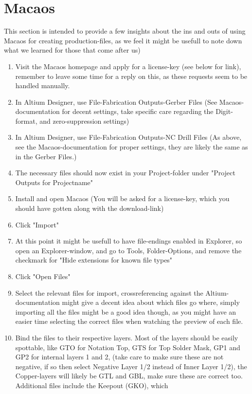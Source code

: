 \section {Macaos}

This section is intended to provide a few insights about the
ins and outs of using Macaos for creating production-files, as we feel 
it might be usefull to note down what we learned for those that come after us)

\begin {enumerate}
\item Visit the Macaos homepage and apply for a license-key (see below for link), remember to leave some
time for a reply on this, as these requests seem to be handled manually.
\item In Altium Designer, use File-Fabrication Outputs-Gerber Files (See Macaos-documentation for decent settings, take specific care regarding the Digit-format, and zero-suppression settings)
\item In Altium Designer, use File-Fabrication Outputs-NC Drill Files (As above, see the Macaos-documentation for proper settings, they are likely the same as in the Gerber Files.)
\item The necessary files should now exist in your Project-folder under "Project Outputs for Projectname"
\item Install and open Macaos (You will be asked for a license-key, which you should have gotten along with
the download-link)
\item Click "Import"
\item At this point it might be usefull to have file-endings enabled in Explorer, so open an Explorer-window,
and go to Tools, Folder-Options, and remove the checkmark for "Hide extensions for known file types"
\item Click "Open Files"
\item Select the relevant files for import, crossreferencing against the Altium-documentation might give a decent idea about which
files go where, simply importing all the files might be a good idea though, as you might have an easier time selecting the correct
files when watching the preview of each file.
\item Bind the files to their respective layers. Most of the layers should be easily spottable, like GTO for Notation Top, GTS for Top Solder Mask, GP1 and GP2 for internal layers 1 and 2, (take care to make sure
these are not negative, if so then select Negative Layer 1/2 instead of Inner Layer 1/2), the Copper-layers will likely be GTL and GBL, make sure these are correct too. Additional files include the Keepout (GKO), which

\end{enumerate}
